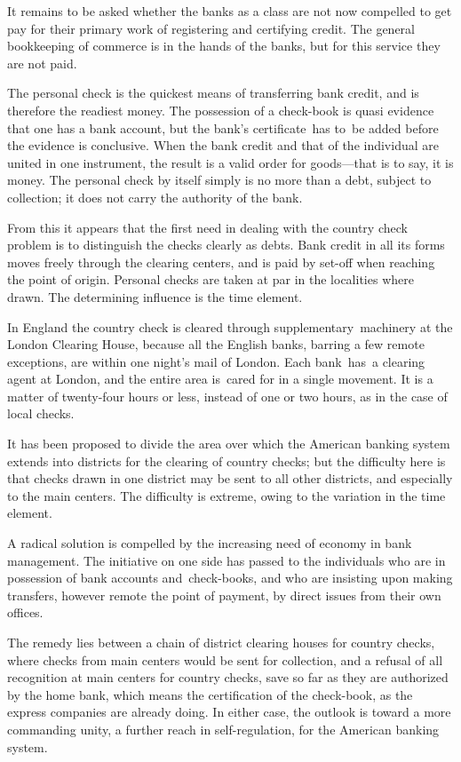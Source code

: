 \documentclass[twoside,symmetric,nobib,justified]{tufte-book}
\begin{document}
It remains to be asked whether the banks as a class are not now
compelled to get pay for their primary work of registering and
certifying credit. The general bookkeeping of commerce is in the hands
of the banks, but for this service they are not paid.~~

The personal check is the quickest means of transferring bank credit,
and is therefore the readiest money. The possession of a check-book is
quasi evidence that one has a bank account, but the bank's
certificate~has to~be added before the evidence is conclusive. When the
bank credit and that of the individual are united in one instrument, the
result is a valid order for goods---that is to say, it is money. The
personal check by itself simply is no more than a debt, subject to
collection; it does not carry the authority of the bank.~

From this it appears that the first need in dealing with the country
check problem is to distinguish the checks clearly as debts. Bank credit
in all its forms moves freely through the clearing centers, and is paid
by set-off when reaching the point of origin. Personal checks are taken
at par in the localities where drawn. The determining influence is the
time element.~

In England the country check is cleared through supplementary~machinery
at the London Clearing House, because all the English banks, barring a
few remote exceptions, are within one night's mail of London. Each
bank~has~a clearing agent at London, and the entire area is~cared for in
a single movement. It is a matter of twenty-four hours or less, instead
of one or two hours, as in the case of local checks.~

It has been proposed to divide the area over which the American banking
system extends into districts for the clearing of country checks; but
the difficulty here is that checks drawn in one district may be sent to
all other districts, and especially to the main centers. The difficulty
is extreme, owing to the variation in the time element.~

A radical solution is compelled by the increasing need of economy in
bank management. The initiative on one side has passed to the
individuals who are in possession of bank accounts and~check-books, and
who are insisting upon making transfers, however remote the point of
payment, by direct issues from their own offices.~

The remedy lies between a chain of district clearing houses for country
checks, where checks from main centers would be sent for collection, and
a refusal of all recognition at main centers for country checks, save so
far as they are authorized by the home bank, which means the
certification of the check-book, as the express companies are already
doing. In either case, the outlook is toward a more commanding unity, a
further reach in self-regulation, for the American banking system.~
\end{document}
